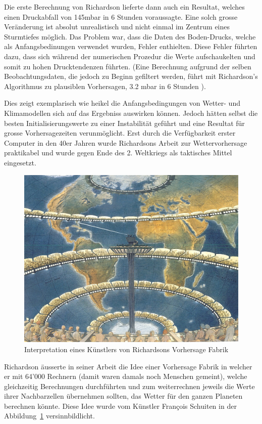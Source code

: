 \begin{refsection}
Die erste Berechnung von Richardson lieferte dann auch ein Resultat, welches einen Druckabfall von 145mbar in 6 Stunden voraussagte. Eine solch grosse Veränderung ist absolut unrealistisch und nicht einmal im Zentrum eines Sturmtiefes möglich. Das Problem war, dass die Daten des Boden-Drucks, welche als Anfangsbedinungen verwendet wurden, Fehler enthielten. Diese Fehler führten dazu, dass sich während der numerischen Prozedur die Werte aufschaukelten und somit zu hohen Drucktendenzen führten. (Eine Berechnung aufgrund der selben Beobachtungsdaten, die jedoch zu Beginn gefiltert werden, führt mit Richardson's Algorithmus zu plausiblen Vorhersagen, 3.2 mbar in 6 Stunden \cite{klima:stocker}).

Dies zeigt exemplarisch wie heikel die Anfangsbedingungen von Wetter- und Klimamodellen sich auf das Ergebniss auswirken können. Jedoch hätten selbst die besten Initialisierungswerte zu einer Instabilität geführt und eine Resultat für grosse Vorhersagezeiten verunmöglicht. Erst durch die Verfügbarkeit erster Computer in den 40er Jahren wurde Richardsons Arbeit zur  Wettervorhersage praktikabel und wurde gegen Ende des 2. Weltkriegs als taktisches Mittel eingesetzt.

\begin{figure}
\centering
\includegraphics{klima/64000.jpg}
\caption{Interpretation eines Künstlers von Richardsons Vorhersage Fabrik \cite{klima:biography}
\label{klima:geschichte:richardson}}
\end{figure}

Richardson äusserte in seiner Arbeit die Idee einer Vorhersage Fabrik in welcher er mit 64'000 Rechnern (damit waren damals noch Menschen gemeint), welche gleichzeitig Berechnungen durchführten und zum weiterrechnen jeweils die Werte ihrer Nachbarzellen übernehmen sollten, das Wetter für den ganzen Planeten berechnen könnte. Diese Idee wurde vom Künstler François Schuiten in der Abbildung~\ref{klima:geschichte:richardson} versinnbildlicht.


\end{refsection}
